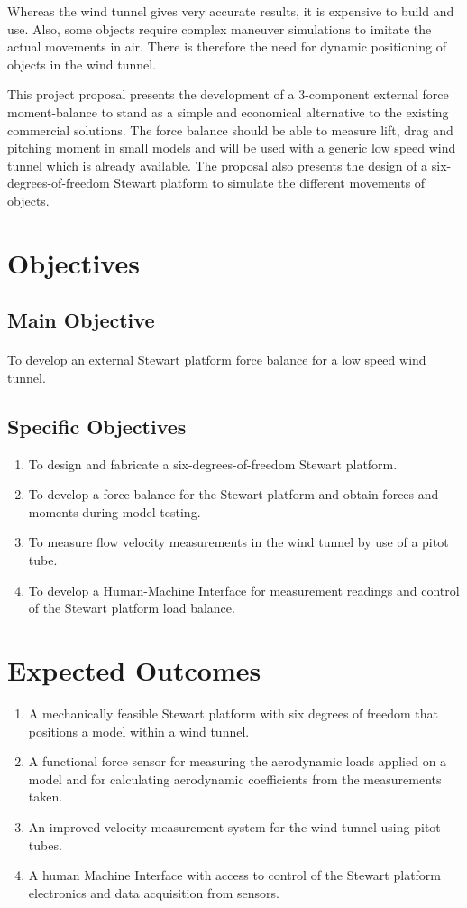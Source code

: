 Whereas the wind tunnel gives very accurate results, it is expensive to build and use. Also, some objects require complex maneuver simulations to imitate the actual movements in air. There is therefore the need for dynamic positioning of objects in the wind tunnel.

This project proposal presents the development of a 3-component external force moment-balance to stand as a simple and economical alternative to the existing commercial solutions. The force balance should be able to measure lift, drag and pitching moment in small models and will be used with a generic low speed wind tunnel which is already available. The proposal also presents the design of a six-degrees-of-freedom Stewart platform to simulate the different movements of objects.
\section{Objectives}
\subsection{Main Objective}
\paragraph{} To develop an external Stewart platform force balance for a low speed wind tunnel. 
\subsection{Specific Objectives}
\begin{enumerate}
\item To design and fabricate a six-degrees-of-freedom Stewart platform.
\item To develop a force balance for the Stewart platform and obtain forces and moments during model testing.
\item To measure flow velocity measurements in the wind tunnel by use of a pitot tube.
\item To develop a Human-Machine Interface for measurement readings and control of the Stewart platform load balance.
\end{enumerate}
\section{Expected Outcomes}
\begin{enumerate}
\item A mechanically feasible Stewart platform with six degrees of freedom that positions a model
within a wind tunnel.
\item A functional force sensor for measuring the aerodynamic loads applied on a model
and for calculating aerodynamic coefficients from the measurements taken.
\item An improved velocity measurement system for the wind tunnel using pitot tubes.
\item A human Machine Interface with access to control of the Stewart platform electronics
and data acquisition from sensors.
\end{enumerate}
